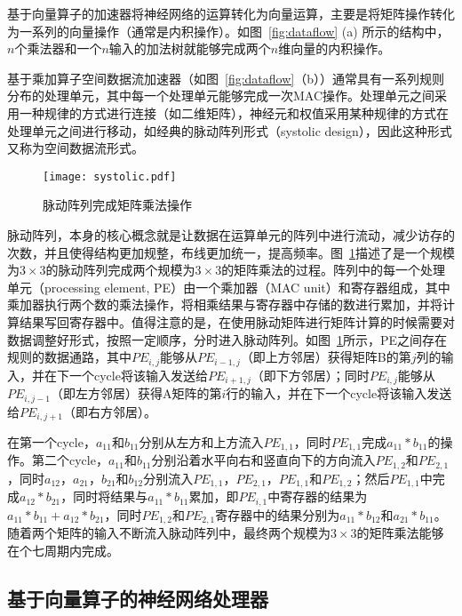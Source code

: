 基于向量算子的加速器将神经网络的运算转化为向量运算，主要是将矩阵操作转化为一系列的向量操作（通常是内积操作）。如图~\ref{fig:dataflow} (a) 所示的结构中，$n$个乘法器和一个$n$输入的加法树就能够完成两个$n$维向量的内积操作。

基于乘加算子空间数据流加速器（如图~\ref{fig:dataflow}（b））通常具有一系列规则分布的处理单元，其中每一个处理单元能够完成一次MAC操作。处理单元之间采用一种规律的方式进行连接（如二维矩阵），神经元和权值采用某种规律的方式在处理单元之间进行移动，如经典的脉动阵列形式（systolic design），因此这种形式又称为空间数据流形式。

\begin{figure}[h]
  \centering
  \texttt{[image: systolic.pdf]}
  \caption{\footnotesize 脉动阵列完成矩阵乘法操作}
  \label{fig:systolic}
\end{figure}

脉动阵列，本身的核心概念就是让数据在运算单元的阵列中进行流动，减少访存的次数，并且使得结构更加规整，布线更加统一，提高频率。图~\ref{fig:systolic}描述了是一个规模为$3\times 3$的脉动阵列完成两个规模为$3\times 3$的矩阵乘法的过程。阵列中的每一个处理单元（processing element, PE）由一个乘加器（MAC unit）和寄存器组成，其中乘加器执行两个数的乘法操作，将相乘结果与寄存器中存储的数进行累加，并将计算结果写回寄存器中。值得注意的是，在使用脉动矩阵进行矩阵计算的时候需要对数据调整好形式，按照一定顺序，分时进入脉动阵列。如图~\ref{fig:systolic}所示，PE之间存在规则的数据通路，其中$PE_{i,j}$能够从$PE_{i-1,j}$（即上方邻居）获得矩阵B的第$j$列的输入，并在下一个cycle将该输入发送给$PE_{i+1,j}$（即下方邻居）；同时$PE_{i,j}$能够从$PE_{i,j-1}$（即左方邻居）获得A矩阵的第$i$行的输入，并在下一个cycle将该输入发送给$PE_{i,j+1}$（即右方邻居）。

在第一个cycle，$a_{11}$和$b_{11}$分别从左方和上方流入$PE_{1,1}$，同时$PE_{1,1}$完成$a_{11}*b_{11}$的操作。第二个cycle，$a_{11}$和$b_{11}$分别沿着水平向右和竖直向下的方向流入$PE_{1,2}$和$PE_{2,1}$，同时$a_{12}$，$a_{21}$，$b_{21}$和$b_{12}$分别流入$PE_{1,1}$，$PE_{2,1}$，$PE_{1,1}$和$PE_{1,2}$；然后$PE_{1,1}$中完成$a_{12}*b_{21}$，同时将结果与$a_{11}*b_{11}$累加，即$PE_{i,1}$中寄存器的结果为$a_{11}*b_{11}+a_{12}*b_{21}$，同时$PE_{1,2}$和$PE_{2,1}$寄存器中的结果分别为$a_{11}*b_{12}$和$a_{21}*b_{11}$。随着两个矩阵的输入不断流入脉动阵列中，最终两个规模为$3\times 3$的矩阵乘法能够在个七周期内完成。


\subsection{基于向量算子的神经网络处理器}

